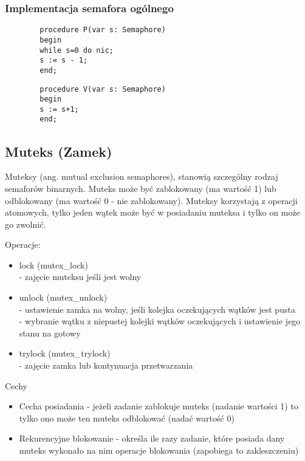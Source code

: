 \documentclass[main.tex]{subfiles}
\begin{document}
    \subsubsection{Implementacja semafora ogólnego}
    \begin{verbatim}
        procedure P(var s: Semaphore)
        begin
        while s=0 do nic;
        s := s - 1;
        end;
    \end{verbatim}

    \begin{verbatim}
        procedure V(var s: Semaphore)
        begin
        s := s+1;
        end;
    \end{verbatim}

    \subsection{Muteks (Zamek)}
    Muteksy (ang. mutual exclusion semaphores), stanowią szczególny rodzaj semaforów binarnych. Muteks może być zablokowany (ma wartość 1) lub odblokowany (ma wartość 0 - nie zablokowany). Muteksy korzystają z operacji atomowych, tylko jeden wątek może być w posiadaniu muteksa i tylko on może go zwolnić.

    Operacje:
    \begin{itemize}
        \item lock (mutex\_lock)\\ - zajęcie muteksu jeśli jest wolny
        \item unlock (mutex\_unlock) \\ - ustawienie zamka na wolny, jeśli kolejka oczekujących wątków jest pusta\\
        - wybranie wątku z niepustej kolejki wątków oczekujących i ustawienie jego stanu na gotowy
        \item trylock (mutex\_trylock)\\ - zajęcie zamka lub kontynuacja przetwarzania
    \end{itemize}

    Cechy
    \begin{itemize}
        \item Cecha posiadania - jeżeli zadanie zablokuje muteks (nadanie wartości 1) to tylko ono może ten muteks odblokować (nadać wartość 0)
        \item Rekurencyjne blokowanie - określa ile razy zadanie, które posiada dany muteks wykonało na nim operacje blokowania (zapobiega to zakleszczeniu)
    \end{itemize}
\end{document}
